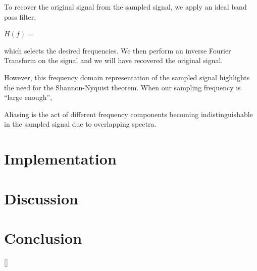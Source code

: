 \documentclass{article}
\begin{document}
To recover the original signal from the sampled signal, we apply an ideal band pass filter,
\begin{center}
    \begin{math}
        H(f) = %
    \end{math}  
\end{center}
which selects the desired frequencies. We then perform an inverse Fourier Transform on the signal and we will have recovered the original signal. %

However, this frequency domain representation of the sampled signal highlights the need for the Shannon-Nyquist theorem. %
When our sampling frequency is ``large enough'', 

Aliasing is the act of different frequency components becoming indistinguishable in the sampled signal due to overlapping spectra. %



\section{Implementation}


\section{Discussion}

\section{Conclusion}

\begin{thebibliography}{9}
    []
\end{thebibliography}
\end{document}
